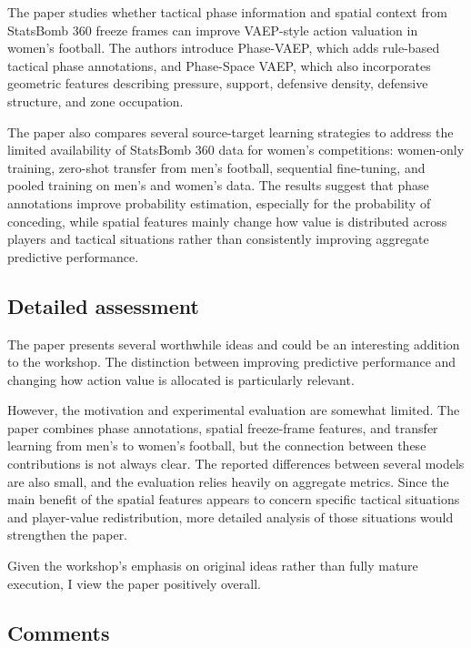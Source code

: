 \documentclass[11pt,a4paper]{article}
\begin{document}
\begin{reviewbox}
The paper studies whether tactical phase information and spatial context from StatsBomb 360 freeze frames can improve VAEP-style action valuation in women's football. The authors introduce Phase-VAEP, which adds rule-based tactical phase annotations, and Phase-Space VAEP, which also incorporates geometric features describing pressure, support, defensive density, defensive structure, and zone occupation.

The paper also compares several source-target learning strategies to address the limited availability of StatsBomb 360 data for women's competitions: women-only training, zero-shot transfer from men's football, sequential fine-tuning, and pooled training on men's and women's data. The results suggest that phase annotations improve probability estimation, especially for the probability of conceding, while spatial features mainly change how value is distributed across players and tactical situations rather than consistently improving aggregate predictive performance.
\end{reviewbox}

\subsection{Detailed assessment}

\begin{reviewbox}
The paper presents several worthwhile ideas and could be an interesting addition to the workshop. The distinction between improving predictive performance and changing how action value is allocated is particularly relevant.

However, the motivation and experimental evaluation are somewhat limited. The paper combines phase annotations, spatial freeze-frame features, and transfer learning from men's to women's football, but the connection between these contributions is not always clear. The reported differences between several models are also small, and the evaluation relies heavily on aggregate metrics. Since the main benefit of the spatial features appears to concern specific tactical situations and player-value redistribution, more detailed analysis of those situations would strengthen the paper.

Given the workshop's emphasis on original ideas rather than fully mature execution, I view the paper positively overall.
\end{reviewbox}

\subsection{Comments}
\end{document}
